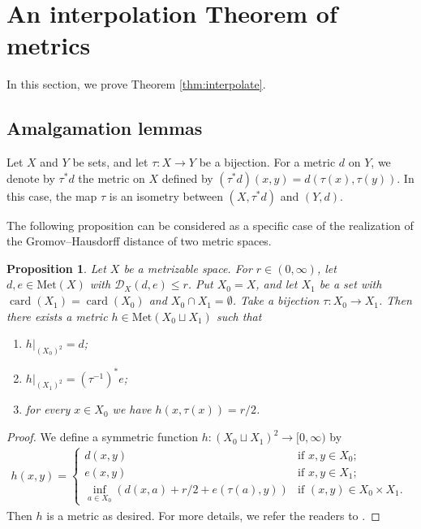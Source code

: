 \documentclass[a4paper, 12pt]{amsart}
\theoremstyle{plain}
\newtheorem{prop}[thm]{Proposition}
\theoremstyle{definition}
\theoremstyle{remark}
\DeclareMathOperator{\card}{card}
\newcommand{\met}[1]{\mathrm{Met}(#1)}
\newcommand{\metdis}{\mathcal{D}}
\begin{document}

\section{An interpolation Theorem of metrics}\label{sec:inter}


In this section, we prove Theorem 
\ref{thm:interpolate}.
\subsection{Amalgamation lemmas}
Let 
$X$ 
and 
$Y$ 
be sets,  
and let
 $\tau\colon  X\to Y$ 
 be a bijection. 
For a metric 
$d$ 
 on 
 $Y$,  
we denote by 
$\tau^{*}d$ 
the metric on 
$X$ 
defined by 
$(\tau^{*}d)(x, y)=d(\tau(x), \tau(y))$. 
In this case, 
 the map 
$\tau$ 
is an isometry between 
$(X, \tau^{*}d)$ 
and 
$(Y, d)$. 




The following proposition can be considered as a specific case 
of the realization of  
the  Gromov--Hausdorff distance of two metric spaces. 
\begin{prop}\label{prop:GH}
Let 
$X$ 
be a metrizable space. 
For  
$r\in (0, \infty)$, 
let 
$d, e\in \met{X}$ 
with 
$\metdis_{X}(d, e)\le r$. 
Put 
$X_{0}=X$, 
and 
let 
$X_{1}$ 
be a set with 
$\card(X_1)=\card(X_0)$ 
and 
$X_{0}\cap X_{1}=\emptyset$. 
Take 
a bijection 
$\tau :X_{0}\to X_{1}$. 
Then there exists a metric 
$h\in \met{X_{0}\sqcup X_{1}}$ 
such that 
\begin{enumerate}
	\item $h|_{(X_{0})^2}=d$;
	\item $h|_{(X_{1})^2}=(\tau^{-1})^{*}e$; 
	\item for every 
	$x\in X_{0}$ 
	we have 
	$h(x, \tau(x))= r/2$. 
\end{enumerate}
\end{prop}
\begin{proof}
We define a symmetric function 
$h: (X_{0}\sqcup X_{1})^2\to [0, \infty)$ 
by
\begin{align*}
	h(x, y)=
		\begin{cases}
		d(x, y) & \text{if $x, y\in X_0$;}\\
		e(x, y) & \text{if $x, y\in X_1$;}\\
		 \inf_{a\in X_0}(d(x, a)+r/2+e(\tau(a), y)) & \text{if $(x, y)\in X_0\times X_1$. }
		\end{cases}
\end{align*}
Then $h$ is a metric as desired. 
For more details, we refer the readers to  \cite[Theorem 7.3.25]{MR1835418}. 
\end{proof}
\end{document}
